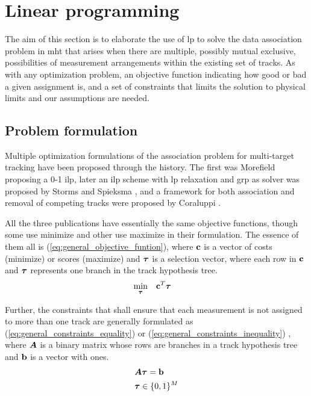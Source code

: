 \section{Linear programming}
\label{sec:ilp}
The aim of this section is to elaborate the use of \gls{lp} to solve the data association problem in \gls{mht} that arises when there are multiple, possibly mutual exclusive, possibilities of measurement arrangements within the existing set of tracks. As with any optimization problem, an objective function indicating how good or bad a given assignment is, and a set of constraints that limits the solution to physical limits and our assumptions are needed.

\subsection{Problem formulation}
Multiple optimization formulations of the association problem for multi-target tracking have been proposed through the history. The first was Morefield \cite{Morefield1977} proposing  a 0-1 \gls{ilp}, later an \gls{ilp} scheme with \gls{lp} relaxation and \gls{grp} as solver was proposed by Storms and Spieksma \cite{Storms2003}, and a framework for both association and removal of competing tracks were proposed by Coraluppi \cite{Coraluppi2004}.

All the three publications have essentially the same objective functions, though some use minimize and other use maximize in their formulation. The essence of them all is (\ref{eq:general_objective_funtion}), where $\boldsymbol{\mathbf{c}}$ is a vector of costs (minimize) or scores (maximize) and $\boldsymbol{\mathbf{\tau}}$ is a selection vector, where each row in $\boldsymbol{\mathbf{c}}$ and $\boldsymbol{\mathbf{\tau}}$ represents one branch in the track hypothesis tree.
\begin{equation}
\begin{aligned}
& \underset{\boldsymbol{\mathbf{\tau}}}{\text{min}}
& & \boldsymbol{\mathbf{c}}^T \boldsymbol{\mathbf{\tau}}
\end{aligned}
\label{eq:general_objective_funtion}
\end{equation}

Further, the constraints that shall ensure that each measurement is not assigned to more  than one track are generally formulated as (\ref{eq:general_constraints_equality}) or (\ref{eq:general_constraints_inequality}) , where $\bm{A}$ is a binary matrix whose rows are branches in a track hypothesis tree and $\boldsymbol{\mathbf{b}}$ is a vector with ones.
\begin{equation}
\begin{aligned}
&	\bm{A} \boldsymbol{\mathbf{\tau}} = \boldsymbol{\mathbf{b}} 	\\
&	\boldsymbol{\mathbf{\tau}} \in \{0,1\}^M
\end{aligned}
\label{eq:general_constraints_equality}
\end{equation}


